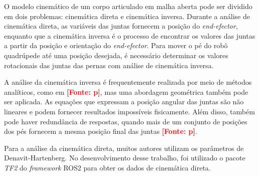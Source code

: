 \documentclass[../main.tex]{subfiles}
\begin{document}
  O modelo cinemático de um corpo articulado em malha aberta pode ser dividido em dois problemas: cinemática direta e cinemática inversa. Durante a análise de cinemática direta, as variáveis das juntas fornecem a posição do \textit{end-efector}, enquanto que a cinemática inversa é o processo de encontrar os valores das juntas a partir da posição e orientação do \textit{end-efector}. Para mover o pé do robô quadrúpede até uma posição desejada, é necessário determinar os valores rotacionais das juntas das pernas com análise de cinemática inversa.
  
  A análise da cinemática inversa é frequentemente realizada por meio de métodos analíticos, como em \textbf{\textcolor{red}{[Fonte: p]}}, mas uma abordagem geométrica também pode ser aplicada. As equações que expressam a posição angular das juntas são não lineares e podem fornecer resultados impossíveis fisicamente. Além disso, também pode haver redundância de respostas, quando mais de um conjunto de posições dos pés fornecem a mesma posição final das juntas \textbf{\textcolor{red}{[Fonte: p]}}.

  Para a análise da cinemática direta, muitos autores utilizam os parâmetros de Denavit-Hartenberg. No desenvolvimento desse trabalho, foi utilizado o pacote \textit{TF2} do \textit{framework} ROS2 para obter os dados de cinemática direta.
\end{document}
